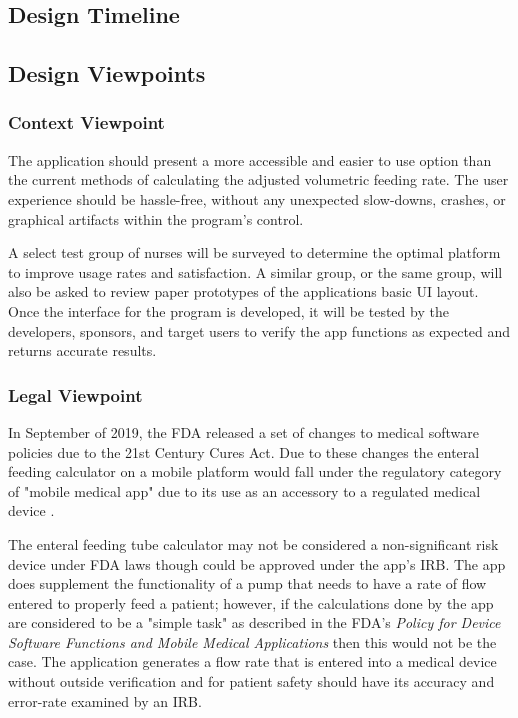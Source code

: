 \documentclass[onecolumn, draftclsnofoot,10pt, compsoc]{IEEEtran}
\begin{document}
\subsection{Design Timeline}

\subsection{Design Viewpoints}
\subsubsection{Context Viewpoint}
The application should present a more accessible and easier to use option than the current methods of calculating the adjusted volumetric feeding rate.
The user experience should be hassle-free, without any unexpected slow-downs, crashes, or graphical artifacts within the program's control.

A select test group of nurses will be surveyed to determine the optimal platform to improve usage rates and satisfaction.
A similar group, or the same group, will also be asked to review paper prototypes of the applications basic UI layout.
Once the interface for the program is developed, it will be tested by the developers, sponsors, and target users to verify the app functions as expected and returns accurate results.


\subsubsection{Legal Viewpoint}
In September of 2019, the FDA released a set of changes to medical software policies due to the 21st Century Cures Act.
Due to these changes the enteral feeding calculator on a mobile platform would fall under the regulatory category of "mobile medical app" due to its use as an accessory to a regulated medical device \autocite{FDA}.

The enteral feeding tube calculator may not be considered a non-significant risk device under FDA laws though could be approved under the app's IRB.
The app does supplement the functionality of a pump that needs to have a rate of flow entered to properly feed a patient; however, if the calculations done by the app are considered to be a "simple task" as described in the FDA's \textit{Policy for Device Software Functions and Mobile Medical Applications} then this would not be the case.
The application generates a flow rate that is entered into a medical device without outside verification and for patient safety should have its accuracy and error-rate examined by an IRB.
\end{document}
